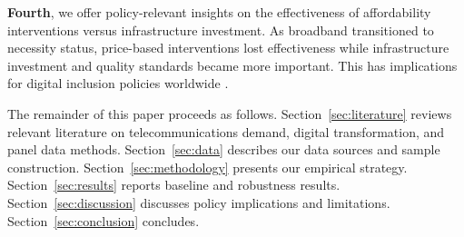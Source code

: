 \textbf{Fourth}, we offer policy-relevant insights on the effectiveness of affordability interventions versus infrastructure investment. As broadband transitioned to necessity status, price-based interventions lost effectiveness while infrastructure investment and quality standards became more important. This has implications for digital inclusion policies worldwide \citep{guermazi2021digital}.

The remainder of this paper proceeds as follows. Section~\ref{sec:literature} reviews relevant literature on telecommunications demand, digital transformation, and panel data methods. Section~\ref{sec:data} describes our data sources and sample construction. Section~\ref{sec:methodology} presents our empirical strategy. Section~\ref{sec:results} reports baseline and robustness results. Section~\ref{sec:discussion} discusses policy implications and limitations. Section~\ref{sec:conclusion} concludes.
